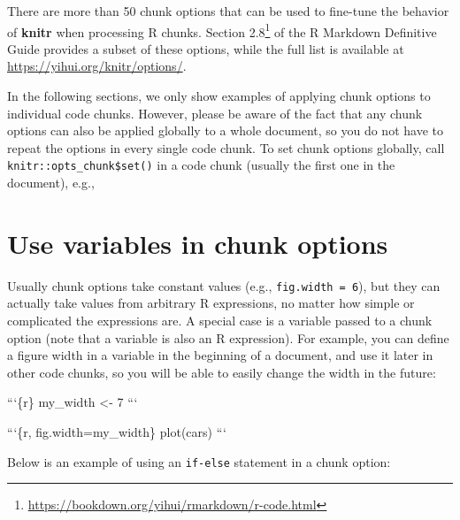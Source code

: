 \documentclass[
  11pt,
]{krantz}
\newenvironment{Shaded}{\begin{snugshade}}{\end{snugshade}}
\newcommand{\BaseNTok}[1]{\textcolor[rgb]{0.06,0.06,0.06}{#1}}
\renewcommand{\href}[2]{#2\footnote{\url{#1}}}
\begin{document}
There are more than 50 chunk options that can be used to fine-tune the behavior of \textbf{knitr} when processing R chunks. \href{https://bookdown.org/yihui/rmarkdown/r-code.html}{Section 2.8} of the R Markdown Definitive Guide \citep{rmarkdown2018} provides a subset of these options, while the full list is available at \url{https://yihui.org/knitr/options/}.

In the following sections, we only show examples of applying chunk options to individual code chunks. However, please be aware of the fact that any chunk options can also be applied globally to a whole document, so you do not have to repeat the options in every single code chunk. To set chunk options globally, call \texttt{knitr::opts\_chunk\$set()} in a code chunk (usually the first one in the document), e.g.,

\begin{Shaded}
\end{Shaded}

\hypertarget{chunk-variable}{%
\section{Use variables in chunk options}\label{chunk-variable}}

Usually chunk options take constant values (e.g., \texttt{fig.width\ =\ 6}), but they can actually take values from arbitrary R expressions, no matter how simple or complicated the expressions are. A special case is a variable passed to a chunk option (note that a variable is also an R expression). For example, you can define a figure width in a variable in the beginning of a document, and use it later in other code chunks, so you will be able to easily change the width in the future:

\begin{Shaded}
\begin{Highlighting}[]
\BaseNTok{```\{r\}}
\BaseNTok{my_width <- 7}
\BaseNTok{```}

\BaseNTok{```\{r, fig.width=my_width\}}
\BaseNTok{plot(cars)}
\BaseNTok{```}
\end{Highlighting}
\end{Shaded}

Below is an example of using an \texttt{if-else} statement in a chunk option:
\end{document}
